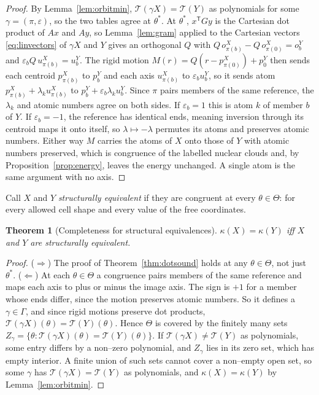 \documentclass[11pt]{article}
\newtheorem{theorem}{Theorem}
\theoremstyle{definition}
\begin{document}
\begin{proof}
By Lemma~\ref{lem:orbitmin}, $\mathcal T(\gamma X)=\mathcal T(Y)$ as
polynomials for some $\gamma=(\pi,\varepsilon)$, so the two tables agree at
$\theta^\ast$. At $\theta^\ast$, $x^{\mathsf T}Gy$ is the Cartesian dot product
of $Ax$ and $Ay$, so Lemma~\ref{lem:gram} applied to the Cartesian vectors
\eqref{eq:linvectors} of $\gamma X$ and $Y$ gives an orthogonal $Q$ with
$Q\,o^X_{\pi(b)}-Q\,o^X_{\pi(0)}=o^Y_b$ and
$\varepsilon_bQ\,u^X_{\pi(b)}=u^Y_b$. The rigid motion
$M(r)=Q(r-p^X_{\pi(0)})+p^Y_0$ then sends each centroid $p^X_{\pi(b)}$ to
$p^Y_b$ and each axis $u^X_{\pi(b)}$ to $\varepsilon_bu^Y_b$, so it sends atom
$p^X_{\pi(b)}+\lambda_ku^X_{\pi(b)}$ to $p^Y_b+\varepsilon_b\lambda_ku^Y_b$.
Since $\pi$ pairs members of the same reference, the $\lambda_k$ and atomic
numbers agree on both sides. If $\varepsilon_b=1$ this is atom $k$ of member
$b$ of $Y$. If $\varepsilon_b=-1$, the reference has identical ends, meaning
inversion through its centroid maps it onto itself, so $\lambda\mapsto-\lambda$
permutes its atoms and preserves atomic numbers. Either way $M$ carries the
atoms of $X$ onto those of $Y$ with atomic numbers preserved, which is
congruence of the labelled nuclear clouds and, by
Proposition~\ref{prop:energy}, leaves the energy unchanged. A single atom is
the same argument with no axis.
\end{proof}

Call $X$ and $Y$ \emph{structurally equivalent} if they are congruent at
every $\theta\in\Theta$: for every allowed cell shape and every value of the
free coordinates.

\begin{theorem}[Completeness for structural equivalences]\label{thm:dotcomplete}
$\kappa(X)=\kappa(Y)$ iff $X$ and $Y$ are structurally equivalent.
\end{theorem}

\begin{proof}
($\Rightarrow$) The proof of Theorem~\ref{thm:dotsound} holds at any
$\theta\in\Theta$, not just $\theta^\ast$. ($\Leftarrow$) At each
$\theta\in\Theta$ a congruence pairs members of the same reference and maps
each axis to plus or minus the image axis. The sign is $+1$ for a member whose
ends differ, since the motion preserves atomic numbers. So it defines a
$\gamma\in\Gamma$, and since rigid motions preserve dot products,
$\mathcal T(\gamma X)(\theta)=\mathcal T(Y)(\theta)$. Hence $\Theta$ is
covered by the finitely many sets
$Z_\gamma=\{\theta:\mathcal T(\gamma X)(\theta)=\mathcal T(Y)(\theta)\}$.
If $\mathcal T(\gamma X)\neq\mathcal T(Y)$ as polynomials, some entry differs
by a non--zero polynomial, and $Z_\gamma$ lies in its zero set, which has
empty interior. A finite union of such sets cannot cover a non--empty open
set, so some $\gamma$ has $\mathcal T(\gamma X)=\mathcal T(Y)$ as polynomials,
and $\kappa(X)=\kappa(Y)$ by Lemma~\ref{lem:orbitmin}.
\end{proof}
\end{document}
